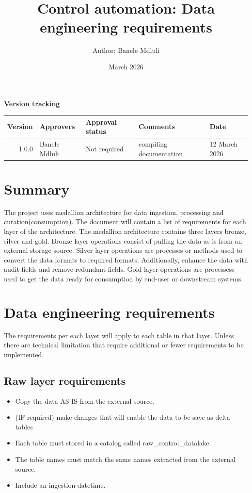 \documentclass{article}
\title{Control automation: Data engineering requirements}
\author{Author: Banele Mdluli}
\date{March 2026}
\begin{document}
\maketitle
\newpage
\begin{titlepage}
    \centering
    \vspace*{1cm}
    
    {\Huge\bfseries Version tracking\par}
    \vspace{2cm}
    
    \begin{tabular}{|r|l|l|p{4cm}|l|}
        \hline
        \textbf{Version} & \textbf{Approvers} & \textbf{Approval status} & \textbf{Comments} &\textbf{Date} \\
        \hline
          1.0.0 & Banele Mdluli & Not required & compiling documentation & 12 March 2026\\
        \hline
    \end{tabular}
    
    \vfill
    
\end{titlepage}
\newpage

\section{Summary}
The project uses medallion architecture for data ingestion, processing and curation(consumption). The document will
contain a list of requirements for each layer of the architecture. The medallion architecture contains three layers
bronze, silver and gold. Bronze layer operations consist of pulling the data as is from an external storage source.
Silver layer operations are processes or methods used to convert the data formats to required formats. Additionally, 
enhance the data with audit fields and remove redundant fields. Gold layer operations are processess used to 
get the data ready for consumption by end-user or downstream systems.

\section{Data engineering requirements}
The requirements per each layer will apply to each table in that layer. Unless there are technical limitation that 
require additional or fewer requirements to be implemented.
\subsection{Raw layer requirements}
\begin{itemize}
    \item Copy the data AS-IS from the external source.
    \item (IF required) make changes that will enable the data to be save as delta tables
    \item Each table must stored in a catalog called raw\_control\_datalake.
    \item The table names must match the same names extracted from the external source.
    \item Include an ingestion datetime.
\end{itemize}
\end{document}
